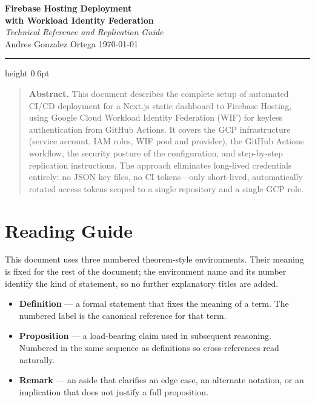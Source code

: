 \documentclass[11pt,a4paper]{article}
\theoremstyle{plainref}
\begin{document}
\begin{center}
  {\LARGE\bfseries Firebase Hosting Deployment\\[2pt]with Workload Identity Federation}\\[4pt]
  {\normalsize\itshape Technical Reference and Replication Guide}\\[10pt]
  {\small Andres Gonzalez Ortega \quad\textbullet\quad \today}
\end{center}
\vspace{4pt}
\hrule height 0.6pt
\vspace{14pt}

\begin{quote}
\small
\textbf{Abstract.} This document describes the complete setup of automated
CI/CD deployment for a Next.js static dashboard to Firebase Hosting, using
Google Cloud Workload Identity Federation (WIF) for keyless authentication
from GitHub Actions. It covers the GCP infrastructure (service account, IAM
roles, WIF pool and provider), the GitHub Actions workflow, the security
posture of the configuration, and step-by-step replication instructions.
The approach eliminates long-lived credentials entirely: no JSON key files,
no CI tokens---only short-lived, automatically rotated access tokens scoped
to a single repository and a single GCP role.
\end{quote}
\vspace{4pt}
\tableofcontents
\newpage

\section*{Reading Guide}

This document uses three numbered theorem-style environments. Their meaning is
fixed for the rest of the document; the environment name and its number identify
the kind of statement, so no further explanatory titles are added.

\begin{itemize}
  \item \textbf{Definition} --- a formal statement that fixes the meaning of a
        term. The numbered label is the canonical reference for that term.
  \item \textbf{Proposition} --- a load-bearing claim used in subsequent reasoning.
        Numbered in the same sequence as definitions so cross-references read
        naturally.
  \item \textbf{Remark} --- an aside that clarifies an edge case, an alternate
        notation, or an implication that does not justify a full proposition.
\end{itemize}
\end{document}
